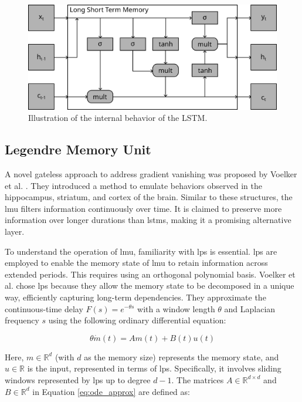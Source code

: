\begin{figure}[t]
    \centering
    \includegraphics[width=\textwidth]{contents/Basics/lstm.png}
    \caption{Illustration of the internal behavior of the LSTM.}
    \label{fig:lstm}
\end{figure}


\subsection{Legendre Memory Unit}
\label{sect:lmu}

A novel gateless approach to address gradient vanishing was proposed by Voelker et al. \cite{lmu}. They introduced a method to emulate behaviors observed in the hippocampus, striatum, and cortex of the brain. Similar to these structures, the \gls{lmu} filters information continuously over time. It is claimed to preserve more information over longer durations than \glspl{lstm}, making it a promising alternative layer.

To understand the operation of \gls{lmu}, familiarity with \glspl{lp} is essential. \glspl{lp} are employed to enable the memory state of \gls{lmu} to retain information across extended periods. This requires using an orthogonal polynomial basis. Voelker et al. chose \glspl{lp} because they allow the memory state to be decomposed in a unique way, efficiently capturing long-term dependencies. They approximate the continuous-time delay \( F(s) = e^{-\theta s} \) with a window length \( \theta \) and Laplacian frequency \( s \) using the following ordinary differential equation:

\begin{equation}
\label{eq:ode_approx}
    \theta \dot{m}(t) = Am(t) + B(t)u(t)
\end{equation}

Here, \( m \in \mathbb{R}^d \) (with \( d \) as the memory size) represents the memory state, and \( u \in \mathbb{R} \) is the input, represented in terms of \glspl{lp}. Specifically, it involves sliding windows represented by \glspl{lp} up to degree \( d-1 \). The matrices \( A \in \mathbb{R}^{d \times d} \) and \( B \in \mathbb{R}^{d} \) in Equation \eqref{eq:ode_approx} are defined as:

